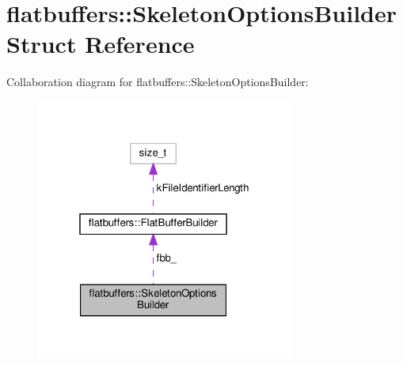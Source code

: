 \hypertarget{structflatbuffers_1_1SkeletonOptionsBuilder}{}\section{flatbuffers\+:\+:Skeleton\+Options\+Builder Struct Reference}
\label{structflatbuffers_1_1SkeletonOptionsBuilder}


Collaboration diagram for flatbuffers\+:\+:Skeleton\+Options\+Builder\+:
\nopagebreak
\begin{figure}[H]
\begin{center}
\leavevmode
\includegraphics[width=241pt]{structflatbuffers_1_1SkeletonOptionsBuilder__coll__graph}
\end{center}
\end{figure}
